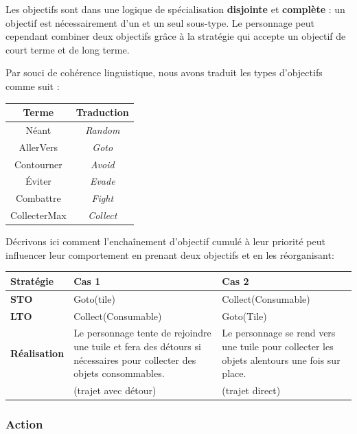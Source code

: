 \documentclass[oneside,a4paper]{book}
\begin{document}
Les objectifs sont dans une logique de spécialisation \textbf{disjointe} et \textbf{complète} : un objectif est nécessairement d'un et un seul sous-type. Le personnage peut cependant combiner deux objectifs grâce à la stratégie qui accepte un objectif de court terme et de long terme.\newline

\begin{samepage}
Par souci de cohérence linguistique, nous avons traduit les types d'objectifs comme suit :
\begin{center}
\begin{tabular}{c|c}
      \textbf{Terme} & \textbf{Traduction} \\\hline\hline
      Néant & \textit{Random}\\
      AllerVers & \textit{Goto}\\
      Contourner & \textit{Avoid}\\
      Éviter & \textit{Evade}\\
      Combattre & \textit{Fight}\\
      CollecterMax & \textit{Collect}\\
\end{tabular}
\end{center}
\end{samepage}

Décrivons ici comment l'enchaînement d'objectif cumulé à leur priorité peut influencer leur comportement en prenant deux objectifs et en les réorganisant:
\begin{center}
    \begin{tabular}{p{}|p{5cm}|p{5cm}}
        \textbf{Stratégie} & \textbf{Cas 1} & \textbf{Cas 2}\\\hline\hline
         \textbf{STO} &  Goto(tile) & Collect(Consumable)\\\hline
         \textbf{LTO} & Collect(Consumable) & Goto(Tile)\\\hline
         \textbf{Réalisation} & Le personnage tente de rejoindre une tuile et fera des détours si nécessaires pour collecter des objets consommables. & Le personnage se rend vers une tuile pour collecter les objets alentours une fois sur place.\\
          & (trajet avec détour) & (trajet direct)
    \end{tabular}
\end{center}

\subsubsection{Action}
\end{document}
